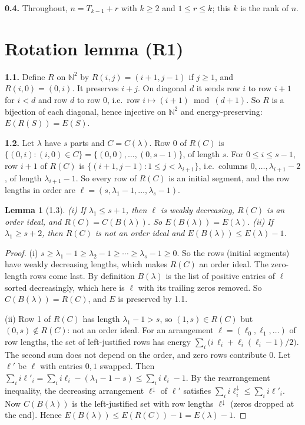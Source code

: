 \documentclass[11pt]{article}
\newtheorem{lemma}{Lemma}
\theoremstyle{remark}
\newcommand{\N}{\mathbb{N}}
\begin{document}
\textbf{0.4.} Throughout, $n=T_{k-1}+r$ with $k\ge 2$ and $1\le r\le k$; this $k$ is the rank of $n$.

\section{Rotation lemma (R1)}

\textbf{1.1.} Define $R$ on $\N^2$ by $R(i,j)=(i+1,j-1)$ if $j\ge1$, and $R(i,0)=(0,i)$. It preserves $i+j$. On
diagonal $d$ it sends row $i$ to row $i+1$ for $i<d$ and row $d$ to row $0$, i.e.\ row $i\mapsto (i+1)\bmod (d+1)$.
So $R$ is a bijection of each diagonal, hence injective on $\N^2$ and energy-preserving: $E(R(S))=E(S)$.

\textbf{1.2.} Let $\lambda$ have $s$ parts and $C=C(\lambda)$. Row $0$ of $R(C)$ is
$\{(0,i):(i,0)\in C\}=\{(0,0),\dots,(0,s-1)\}$, of length $s$. For $0\le i\le s-1$, row $i+1$ of $R(C)$ is
$\{(i+1,j-1):1\le j<\lambda_{i+1}\}$, i.e.\ columns $0,\dots,\lambda_{i+1}-2$, of length $\lambda_{i+1}-1$. So every
row of $R(C)$ is an initial segment, and the row lengths in order are $\ell=(s,\lambda_1-1,\dots,\lambda_s-1)$.

\begin{lemma}[1.3]\label{lem:R1}
(i) If $\lambda_1\le s+1$, then $\ell$ is weakly decreasing, $R(C)$ is an order ideal, and $R(C)=C(B(\lambda))$.
So $E(B(\lambda))=E(\lambda)$. (ii) If $\lambda_1\ge s+2$, then $R(C)$ is not an order ideal and
$E(B(\lambda))\le E(\lambda)-1$.
\end{lemma}

\begin{proof}
(i) $s\ge\lambda_1-1\ge\lambda_2-1\ge\cdots\ge\lambda_s-1\ge0$. So the rows (initial segments) have weakly
decreasing lengths, which makes $R(C)$ an order ideal. The zero-length rows come last. By definition $B(\lambda)$
is the list of positive entries of $\ell$ sorted decreasingly, which here is $\ell$ with its trailing zeros
removed. So $C(B(\lambda))=R(C)$, and $E$ is preserved by 1.1.

(ii) Row 1 of $R(C)$ has length $\lambda_1-1>s$, so $(1,s)\in R(C)$ but $(0,s)\notin R(C)$: not an order ideal.
For an arrangement $\ell=(\ell_0,\ell_1,\dots)$ of row lengths, the set of left-justified rows has energy
$\sum_i\big(i\,\ell_i+\ell_i(\ell_i-1)/2\big)$. The second sum does not depend on the order, and zero rows
contribute $0$. Let $\ell'$ be $\ell$ with entries $0,1$ swapped. Then
$\sum_i i\ell'_i=\sum_i i\ell_i-(\lambda_1-1-s)\le\sum_i i\ell_i-1$. By the rearrangement inequality, the
decreasing arrangement $\ell^{\downarrow}$ of $\ell'$ satisfies $\sum_i i\ell^{\downarrow}_i\le\sum_i i\ell'_i$.
Now $C(B(\lambda))$ is the left-justified set with row lengths $\ell^{\downarrow}$ (zeros dropped at the end).
Hence $E(B(\lambda))\le E(R(C))-1=E(\lambda)-1$.
\end{proof}
\end{document}
